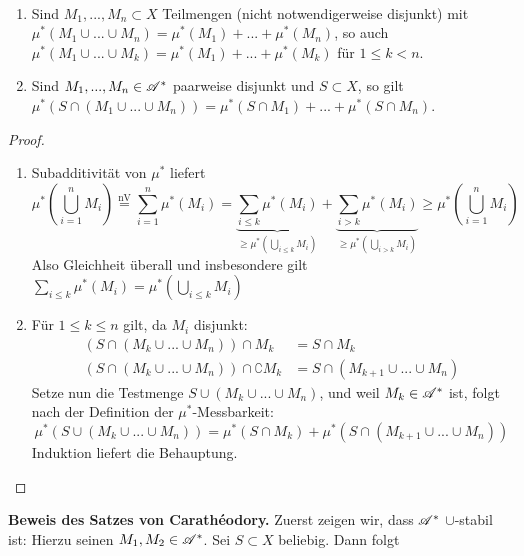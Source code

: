 \begin{lemma}\
\begin{enumerate}[label=(\roman*),topsep=3pt, itemsep=0pt]
\item Sind $M_1,...,M_n \subset X$ Teilmengen (nicht notwendigerweise disjunkt) mit $\mu^*(M_1\cup...\cup M_n)=\mu^*(M_1)+...+\mu^*(M_n)$, so auch $\mu^*(M_1 \cup ... \cup M_k) = \mu^*(M_1) + ... +\mu^*(M_k)$ für $1 \leq k <n$.
\item Sind $M_1,...,M_n \in \AA^*$ paarweise disjunkt und $S\subset X$, so gilt $\mu^*(S\cap(M_1 \cup ... \cup M_n)) = \mu^*(S \cap M_1) + ... +\mu^*(S \cap M_n)$.
\end{enumerate}
\begin{proof}
\begin{enumerate}[label=(\roman*),topsep=3pt, itemsep=0pt]
	\item Subadditivität von $\mu^*$ liefert
	\begin{equation*}
	\mu^*\left( \bigcup_{i=1}^n M_i \right) \overset{\text{nV}}= \sum_{i=1}^n \mu^*(M_i)= \underbrace{\sum_{i\leq k} \mu^*(M_i)}_{\geq \mu^*\left(\bigcup\limits_{i\leq k} M_i\right)}+\underbrace{\sum_{i>k}\mu^*(M_i)}_{\geq \mu^*\left(\bigcup\limits_{i> k} M_i\right)} \geq \mu^*\left( \bigcup_{i=1}^n M_i \right)
	\end{equation*}
	Also Gleichheit überall und insbesondere gilt $\sum\limits_{i\leq k} \mu^*(M_i)=\mu^* \left(\bigcup\limits_{i\leq k} M_i \right)$
	\item Für $1 \leq k \leq n$ gilt, da $M_i$ disjunkt:
	\begin{equation*}
		\begin{split}
			(S\cap (M_k \cup ... \cup M_n))\cap M_k &= S \cap M_k \\
			(S\cap (M_k \cup ... \cup M_n))\cap \complement M_k &= S \cap (M_{k+1}\cup...\cup M_n)
		\end{split}
	\end{equation*}
	Setze nun die Testmenge $S \cup (M_k \cup ... \cup M_n)$, und weil $M_k \in \AA^*$ ist, folgt nach der Definition der $\mu^*$-Messbarkeit:
	$$\mu^*(S \cup (M_k \cup ... \cup M_n)) = \mu^*(S \cap M_k) + \mu^*(S \cap (M_{k+1}\cup...\cup M_n))$$
	Induktion liefert die Behauptung.
\end{enumerate}
\end{proof}
\end{lemma}
\textbf{Beweis des Satzes von Carathéodory.} Zuerst zeigen wir, dass $\AA^*$ $\cup$-stabil ist: Hierzu seinen $M_1, M_2 \in \AA^*$. Sei $S \subset X$ beliebig. Dann folgt
